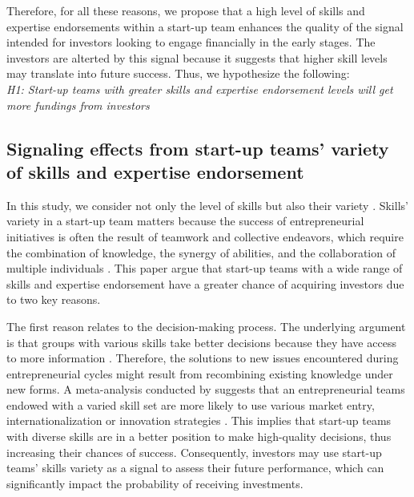 \documentclass[12pt]{article}
\begin{document}
Therefore, for all these reasons, we propose that a high level of skills and expertise endorsements within a start-up team enhances the quality of the signal intended for investors looking to engage financially in the early stages. The investors are alterted by this signal because it suggests that higher skill levels may translate into future success. Thus, we hypothesize the following: \\

\noindent \textit{H1: Start-up teams with greater skills and expertise endorsement levels will get more fundings from investors}

\subsection{Signaling effects from start-up teams' variety of skills and expertise endorsement}


In this study, we consider not only the level of skills but also their variety \citep{harrison2007s}. Skills' variety in a start-up team matters because the success of entrepreneurial initiatives is often the result of teamwork and collective endeavors, which require the combination of knowledge, the synergy of abilities, and the collaboration of multiple individuals \citep{klotz2014new}. This paper argue that start-up teams with a wide range of skills and expertise endorsement have a greater chance of acquiring investors due to two key reasons.

The first reason relates to the decision-making process. The underlying argument is that groups with various skills take better decisions because they have access to more information \citep{hong2001problem}. Therefore, the solutions to new issues encountered during entrepreneurial cycles might result from recombining existing knowledge under new forms. A meta-analysis conducted by \citet{jin2017entrepreneurial} suggests that an entrepreneurial teams endowed with a varied skill set are more likely to use various market entry, internationalization or innovation strategies \citep{boeker1989strategic}. This implies that start-up teams with diverse skills are in a better position to make high-quality decisions, thus increasing their chances of success. Consequently, investors may use start-up teams' skills variety as a signal to assess their future performance, which can significantly impact the probability of receiving investments.
\end{document}
